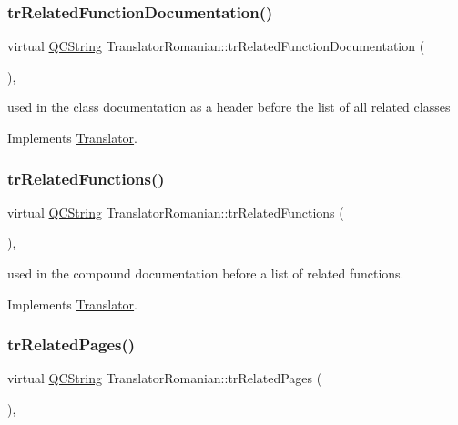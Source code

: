 \subsubsection{\texorpdfstring{trRelatedFunctionDocumentation()}{trRelatedFunctionDocumentation()}}
{\footnotesize\ttfamily virtual \mbox{\hyperlink{class_q_c_string}{Q\+C\+String}} Translator\+Romanian\+::tr\+Related\+Function\+Documentation (\begin{DoxyParamCaption}{ }\end{DoxyParamCaption})\hspace{0.3cm}{\ttfamily [inline]}, {\ttfamily [virtual]}}

used in the class documentation as a header before the list of all related classes 

Implements \mbox{\hyperlink{class_translator}{Translator}}.

\mbox{\label{class_translator_romanian_a3a61d1f3cbbc248e30bed73b91822a7c}} 
\subsubsection{\texorpdfstring{trRelatedFunctions()}{trRelatedFunctions()}}
{\footnotesize\ttfamily virtual \mbox{\hyperlink{class_q_c_string}{Q\+C\+String}} Translator\+Romanian\+::tr\+Related\+Functions (\begin{DoxyParamCaption}{ }\end{DoxyParamCaption})\hspace{0.3cm}{\ttfamily [inline]}, {\ttfamily [virtual]}}

used in the compound documentation before a list of related functions. 

Implements \mbox{\hyperlink{class_translator}{Translator}}.

\mbox{\label{class_translator_romanian_ab49101aab83d02cf83c836effde126e2}} 
\subsubsection{\texorpdfstring{trRelatedPages()}{trRelatedPages()}}
{\footnotesize\ttfamily virtual \mbox{\hyperlink{class_q_c_string}{Q\+C\+String}} Translator\+Romanian\+::tr\+Related\+Pages (\begin{DoxyParamCaption}{ }\end{DoxyParamCaption})\hspace{0.3cm}{\ttfamily [inline]}, {\ttfamily [virtual]}}

